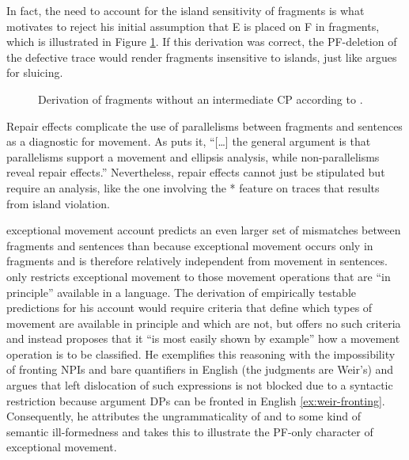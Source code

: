 \newpage
\noindent In fact, the need to account for the island sensitivity of fragments is what motivates \citeauthor{merchant2004} to reject his initial assumption that E is placed on F in fragments, which is illustrated in Figure \ref{ex:merchant.structure-reduced}. If this derivation was correct, the PF-deletion of the defective trace would render fragments insensitive to islands, just like \citet{merchant2001} argues for sluicing.
%
\begin{figure}
 
\caption{Derivation of fragments without an intermediate CP according to \citet[675]{merchant2004}.\label{ex:merchant.structure-reduced}} 
\end{figure}
%
Repair effects complicate the use of parallelisms between fragments and sentences as a diagnostic for movement. As \citet[711]{merchant2004} puts it, ``[\dots] the general argument is that parallelisms support a movement and ellipsis analysis, while non-parallelisms reveal repair effects.'' Nevertheless, repair effects cannot just be stipulated but require an analysis, like the one involving the * feature on traces that results from island violation.

 exceptional movement account predicts an even larger set of mismatches between fragments and sentences than \citet{merchant2004} because exceptional movement occurs only in fragments and is therefore relatively independent from movement in sentences. \citeauthor{weir2014} only restricts exceptional movement to those movement operations that are ``in principle'' available in a language.  The derivation of empirically testable predictions for his account would require criteria that define which types of movement are available in principle and which are not, but \citet[10]{weir2015} offers no such criteria and instead proposes that it ``is most easily shown by example'' how a movement operation is to be classified. He exemplifies this reasoning with the impossibility of fronting NPIs \Next[a] and bare quantifiers \NNext[a] in English (the judgments are Weir's) and argues that left dislocation of such expressions is not blocked due to a syntactic restriction because argument DPs can be fronted in English \ref{ex:weir-fronting}. Consequently, he attributes the ungrammaticality of \Next[a] and \NNext[a] to some kind of semantic ill-formedness and takes this to illustrate the PF-only character of exceptional movement.

